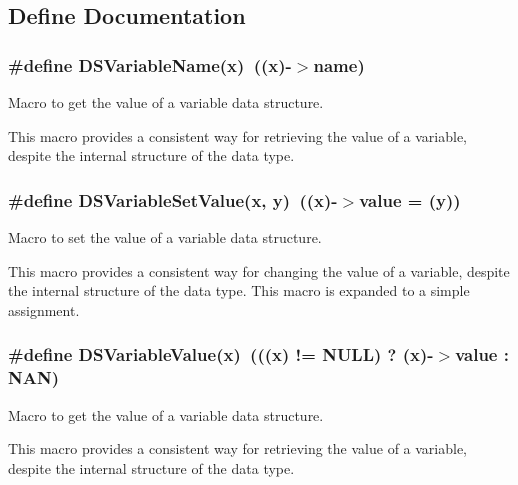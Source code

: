 \subsection{Define Documentation}
\hypertarget{group___d_s___v_a_r_i_a_b_l_e___a_c_c_e_s_s_o_r_y_ga64afbf5e8e378ef611c25084211152c4}{
\subsubsection[{DSVariableName}]{\setlength{\rightskip}{0pt plus 5cm}\#define DSVariableName(x)~((x)-\/$>$name)}}
\label{group___d_s___v_a_r_i_a_b_l_e___a_c_c_e_s_s_o_r_y_ga64afbf5e8e378ef611c25084211152c4}


Macro to get the value of a variable data structure. 

This macro provides a consistent way for retrieving the value of a variable, despite the internal structure of the data type. \hypertarget{group___d_s___v_a_r_i_a_b_l_e___a_c_c_e_s_s_o_r_y_ga218a0d1de0bb5ea62d7e5aa22fe50793}{
\subsubsection[{DSVariableSetValue}]{\setlength{\rightskip}{0pt plus 5cm}\#define DSVariableSetValue(x, \/  y)~((x)-\/$>$value = (y))}}
\label{group___d_s___v_a_r_i_a_b_l_e___a_c_c_e_s_s_o_r_y_ga218a0d1de0bb5ea62d7e5aa22fe50793}


Macro to set the value of a variable data structure. 

This macro provides a consistent way for changing the value of a variable, despite the internal structure of the data type. This macro is expanded to a simple assignment. \hypertarget{group___d_s___v_a_r_i_a_b_l_e___a_c_c_e_s_s_o_r_y_ga837d0718b28591df6f518eb50d98082a}{
\subsubsection[{DSVariableValue}]{\setlength{\rightskip}{0pt plus 5cm}\#define DSVariableValue(x)~(((x) != NULL) ? (x)-\/$>$value : NAN)}}
\label{group___d_s___v_a_r_i_a_b_l_e___a_c_c_e_s_s_o_r_y_ga837d0718b28591df6f518eb50d98082a}


Macro to get the value of a variable data structure. 

This macro provides a consistent way for retrieving the value of a variable, despite the internal structure of the data type. 